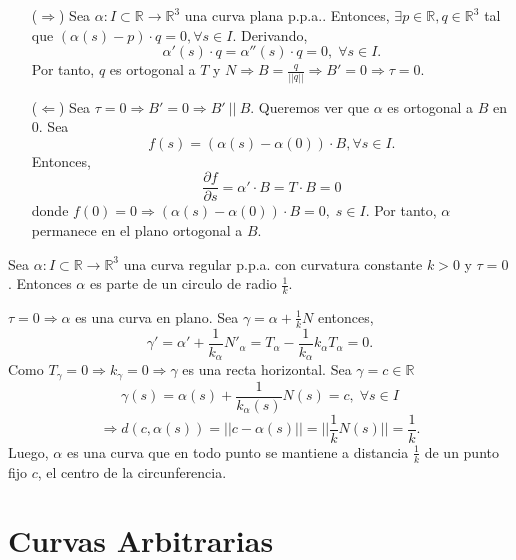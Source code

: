 \begin{dem}
  \begin{enumerate}[label=(\roman*)]
    \item [($\Rightarrow$)] Sea $\alpha  : I \subset \mathbb{R} \to \mathbb{R}^{3}$ una curva plana p.p.a.. Entonces, $\exists p \in \mathbb{R}, q \in \mathbb{R}^{3}$ tal que $(\alpha(s) - p) \cdot q = 0, \forall s \in I$. Derivando,
  \[ 
    \alpha'(s) \cdot q = \alpha''(s) \cdot q = 0, \; \forall s \in I.
  \] 
  Por tanto, $q$ es ortogonal a $T$ y $N \Rightarrow B = \frac{q}{||q||} \Rightarrow B' = 0 \Rightarrow \tau = 0$.
    \item [($\Leftarrow$)] Sea $\tau = 0 \Rightarrow B' = 0 \Rightarrow B' \ || \ B$. Queremos ver que $\alpha$ es ortogonal a $B$ en $0$. Sea 
      \[ 
        f(s) = (\alpha(s) - \alpha(0)) \cdot B, \forall s \in I .
      \] 
      Entonces,
      \[
        \frac{\partial{f}}{\partial{s}} = \alpha' \cdot B = T \cdot B = 0
      \]
      donde $f(0) = 0 \Rightarrow (\alpha(s) - \alpha(0)) \cdot B = 0, \; s \in I$. Por tanto, $\alpha$ permanece en el plano ortogonal a $B$.
  \end{enumerate}
\end{dem}

\begin{prop}
  Sea $\alpha  : I \subset \mathbb{R} \to \mathbb{R}^{3}$ una curva regular p.p.a. con curvatura constante $k>0$ y $\tau = 0$. Entonces $\alpha$ es parte de un circulo de radio $\frac{1}{k}$.
\end{prop}

\begin{dem}
  $\tau = 0 \Rightarrow \alpha$ es una curva en plano. Sea $\gamma = \alpha + \frac{1}{k}N$ entonces,
  \[ 
    \gamma' = \alpha' + \frac{1}{k_{\alpha}}N'_{\alpha} = T_{\alpha} - \frac{1}{k_{\alpha}}k_{\alpha}T_{\alpha} = 0.
  \] 
  Como $T_{\gamma} = 0 \Rightarrow k_{\gamma} =0 \Rightarrow \gamma$ es una recta horizontal. Sea $\gamma = c \in \mathbb{R}$
  \[ 
    \gamma(s) = \alpha(s) + \frac{1}{k_{\alpha}(s)}N(s) = c, \; \forall s  \in I
  \] 
  \[ 
    \Rightarrow d(c, \alpha(s)) = ||c - \alpha(s)|| = ||\frac{1}{k}N(s)|| = \frac{1}{k}.
  \] 
  Luego, $\alpha$ es una curva que en todo punto se mantiene a distancia $\frac{1}{k}$ de un punto fijo $c$, el centro de la circunferencia.
\end{dem}

\section{Curvas Arbitrarias}

